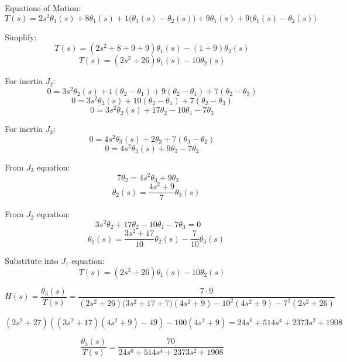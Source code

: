 Equations of Motion:
\[
T(s) = 2 s^2 \theta_1(s) + 8 \theta_1(s) + 1 \big(\theta_1(s) - \theta_2(s)\big) + 9 \theta_1(s) + 9 \big(\theta_1(s) - \theta_2(s)\big)
\]

Simplify:
\[
T(s) = (2 s^2 + 8 + 9 + 9)\theta_1(s) - (1 + 9)\theta_2(s)
\]
\[
T(s) = (2 s^2 + 26)\theta_1(s) - 10 \theta_2(s)
\]

For inertia $J_2$:
\[
0 = 3 s^2 \theta_2(s) + 1 (\theta_2 - \theta_1) + 9 (\theta_2 - \theta_1) + 7 (\theta_2 - \theta_3)
\]
\[
0 = 3 s^2 \theta_2(s) + 10(\theta_2 - \theta_1) + 7 (\theta_2 - \theta_3)
\]
\[
0 = 3 s^2 \theta_2(s) + 17 \theta_2 - 10 \theta_1 - 7 \theta_3
\]

For inertia $J_3$:
\[
0 = 4 s^2 \theta_3(s) + 2 \theta_3 + 7 (\theta_3 - \theta_2)
\]
\[
0 = 4 s^2 \theta_3(s) + 9 \theta_3 - 7 \theta_2
\]

From $J_3$ equation:
\[
7 \theta_2 = 4 s^2 \theta_3 + 9 \theta_3
\quad 
\]
\[
\quad
\theta_2(s) = \frac{4 s^2 + 9}{7} \theta_3(s)
\]

From $J_2$ equation:
\[
3 s^2 \theta_2 + 17 \theta_2 - 10 \theta_1 - 7 \theta_3 = 0
\quad
\]
\[
\quad
\theta_1(s) = \frac{3 s^2 + 17}{10} \theta_2(s) - \frac{7}{10} \theta_3(s)
\]

Substitute into $J_1$ equation:
\[
T(s) = (2 s^2 + 26)\theta_1(s) - 10 \theta_2(s)
\]

\[
H(s) = \frac{\theta_3(s)}{T(s)} = \frac{7 \cdot 9}{(2 s^2 + 26)\big(3 s^2 + 17 + 7\big)(4 s^2 + 9) - 10^2 (4 s^2 + 9) - 7^2 (2 s^2 + 26)}
\]

\[
(2 s^2 + 27)((3 s^2 + 17)(4 s^2 + 9) - 49) - 100 (4 s^2 + 9) = 24 s^6 + 514 s^4 + 2373 s^2 + 1908
\]

\[
\boxed{
\frac{\theta_3(s)}{T(s)} = \frac{70}{24 s^6 + 514 s^4 + 2373 s^2 + 1908}
}
\]

\newpage

